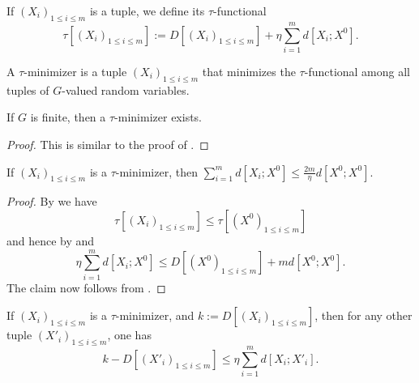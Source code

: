 \begin{definition}\label{tau-def-multi}\leanok  If $(X_i)_{1 \leq i \leq m}$ is a tuple, we define its $\tau$-functional
$$ \tau[ (X_i)_{1 \leq i \leq m}] := D[(X_i)_{1 \leq i \leq m}] + \eta \sum_{i=1}^m d[X_i; X^0].$$
\end{definition}

\begin{definition}
  \label{tau-min-multi}
  \leanok

  A $\tau$-minimizer is a tuple $(X_i)_{1 \leq i \leq m}$ that minimizes the $\tau$-functional
  among all tuples of $G$-valued random variables.
\end{definition}

\begin{proposition}\label{tau-min-exist-multi}\leanok  If $G$ is finite, then a $\tau$-minimizer exists.
\end{proposition}

\begin{proof}\leanok This is similar to the proof of .
\end{proof}

\begin{proposition}\label{tau-ref}\leanok  If $(X_i)_{1 \leq i \leq m}$ is a $\tau$-minimizer, then $\sum_{i=1}^m d[X_i; X^0] \leq \frac{2m}{\eta} d[X^0; X^0]$.
\end{proposition}

\begin{proof}\leanok  By  we have
  $$ \tau[ (X_i)_{1 \leq i \leq m}] \leq \tau[ (X^0)_{1 \leq i \leq m}]$$
and hence by  and 
$$ \eta \sum_{i=1}^m d[X_i; X^0] \leq D[(X^0)_{1 \leq i \leq m}] + m d[X^0; X^0].$$
The claim now follows from .
\end{proof}

\begin{lemma}\label{multidist-lower}\leanok  If  $(X_i)_{1 \leq i \leq m}$ is a $\tau$-minimizer, and $k := D[(X_i)_{1 \leq i \leq m}]$, then for any other tuple $(X'_i)_{1 \leq i \leq m}$, one has
  $$ k - D[(X'_i)_{1 \leq i \leq m}] \leq \eta \sum_{i=1}^m d[X_i; X'_i].$$
\end{lemma}

